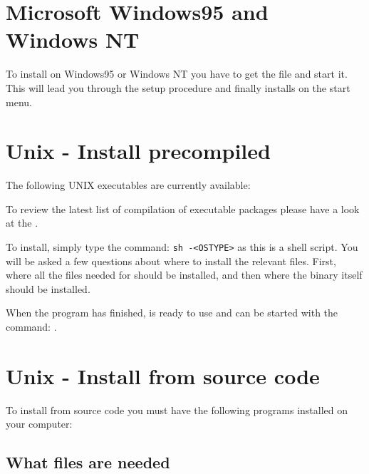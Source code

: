 \section{Microsoft Windows95 and Windows NT}%
\label{Install_Windows95NT}

To install \period on Windows95 or Windows NT you have to
get the file
\urlref{\periodnt}{\periodntftp}
and start it.
This will lead you through the setup procedure 
and finally installs \period on the start menu.

\section{Unix - Install precompiled}%
\label{Install_Unix_precompiled}

The following UNIX executables are currently available:
\myitemize{\periodbinaries}

To review the latest list of compilation of 
\period executable packages please have a look at 
the .

To install, simply type the command:
{\tt sh \periodfull-<OSTYPE>}
as this is a shell script.
You will be asked a few questions about where to install the relevant files.
First, where all the files needed for \period should be installed, and then
where the binary itself should be installed.

When the program has finished, \period is ready to use and can be 
started with the command: {\tt \periodname}.

\newpage
\section{Unix - Install from source code}%
\label{Install_Unix_source}

To install \period from source code you must have the 
following programs installed on your computer:

\subsection{What files are needed}%
\label{Get_SRCS}

